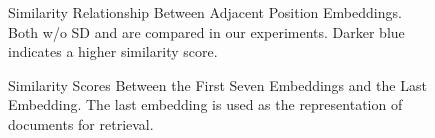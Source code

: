 \begin{figure}[t]
    \centering
    \caption{Similarity Relationship Between Adjacent Position Embeddings. Both \method{} w/o SD and \method{} are compared in our experiments. Darker blue indicates a higher similarity score.}
    \label{fig:hot}
\end{figure}


\begin{figure}[t]
    \centering
    \caption{Similarity Scores Between the First Seven Embeddings and the Last Embedding. The last embedding is used as the representation of documents for retrieval.}
    \label{fig:embed_similarity}
\end{figure}